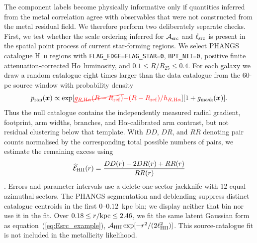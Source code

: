 \documentclass[fleqn,usenatbib]{mnras}
\newcommand{\bs}[1]{\boldsymbol{#1}}
\newcommand{\revaddmath}[1]{\textcolor{red}{#1}}
\newcommand{\revdelmath}[1]{\textcolor{red}{\cancel{#1}}}
\begin{document}
The component labels become physically informative only if quantities inferred from the metal correlation agree with observables that were not constructed from the metal residual field.  We therefore perform two deliberately separate checks.  First, we test whether the scale ordering inferred for ${\cal A}_{\rm src}$ and $\ell_{\rm src}$ is present in the spatial point process of current star-forming regions.  We select PHANGS catalogue H~\textsc{ii} regions with \texttt{FLAG\_EDGE=FLAG\_STAR=0}, \texttt{BPT\_NII=0}, positive finite attenuation-corrected H$\alpha$ luminosity, and $0.1\leq R/R_{25}\leq0.4$.  For each galaxy we draw a random catalogue eight times larger than the data catalogue from the 60-pc source window with probability density
\begin{equation}
    p_{\rm ran}(\bs{x})\propto
    \exp[\revdelmath{g_{R,{\rm H}\alpha}(R-R_{\rm ref})}\revaddmath{-(R-R_{\rm ref})/h_{R,{\rm H}\alpha}}]
    [1+g_{\rm mask}(\bs{x})].
    \label{eq:phangs_hii_random_intensity}
\end{equation}
Thus the null catalogue contains the independently measured radial gradient, footprint, arm widths, branches, and H$\alpha$-calibrated arm contrast, but not residual clustering below that template.  With $DD$, $DR$, and $RR$ denoting pair counts normalised by the corresponding total possible numbers of pairs, we estimate the remaining excess using
\begin{equation}
    \widehat{\mathcal E}_{\rm HII}(r)
    =\frac{DD(r)-2DR(r)+RR(r)}{RR(r)}
    \label{eq:phangs_hii_landy_szalay}
\end{equation}
\citep{LandySzalay1993}.  Errors and parameter intervals use a delete-one-sector jackknife with 12 equal azimuthal sectors.  The PHANGS segmentation and deblending suppress distinct catalogue centroids in the first $0$--$0.12$~kpc bin; we display neither that bin nor use it in the fit.  Over $0.18\leq r/{\rm kpc}\leq2.46$, we fit the same latent Gaussian form as equation~(\ref{eq:Esrc_example}), ${\cal A}_{\rm HII}\exp[-r^2/(2\ell_{\rm HII}^2)]$.  This source-catalogue fit is not included in the metallicity likelihood.
\end{document}
